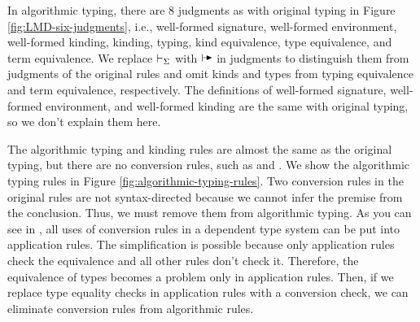 
In algorithmic typing, there are 8 judgments as with original typing in Figure
\ref{fig:LMD-six-judgments}, i.e., well-formed signature, well-formed
environment, well-formed kinding, kinding, typing, kind equivalence, type
equivalence, and term equivalence. We replace \( \vdash_\Sigma \) with \( \AV \) in
judgments to distinguish them from judgments of the original rules and omit
kinds and types from typing equivalence and term equivalence, respectively. The
definitions of well-formed signature, well-formed environment, and well-formed
kinding are the same with original typing, so we don't explain them here.


The algorithmic typing and kinding rules are almost the same as the original
typing, but there are no conversion rules, such as \TConv and \KConv. We show
the algorithmic typing rules in Figure \ref{fig:algorithmic-typing-rules}. Two
conversion rules in the original rules are not syntax-directed because we cannot infer the premise
from the conclusion. Thus, we must remove them from algorithmic typing.  As you
can see in \cite{benjamin2005attapldependent}, all uses of conversion rules in
a dependent type system can be put into application rules.  The simplification
is possible because only application rules check the equivalence and all other
rules don't check it. Therefore, the equivalence of types becomes a problem
only in application rules. Then, if we replace type equality checks in
application rules with a conversion check, we can eliminate conversion rules
from algorithmic rules.

